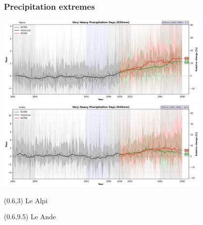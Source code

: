 \begin{frame}
\frametitle{Precipitation extremes}
\begin{center}

{\includegraphics[width=0.8\textwidth]{risultati/r20mm_Alpine_Models_ts}}
{\includegraphics[width=0.8\textwidth]{risultati/r20mm_Andes_Models_ts}}
\end{center}

{
  \scriptsize
  \begin{textblock}{1.8}(0.6,3)
     {\color{gray} Le Alpi}
  \end{textblock}
}


{
  \scriptsize
  \begin{textblock}{1.8}(0.6,9.5)
     {\color{gray} Le Ande}
  \end{textblock}
}

\end{frame}

